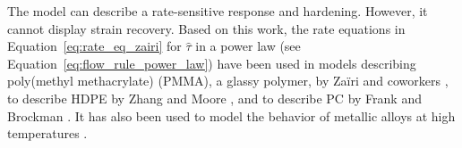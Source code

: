 The model can describe a rate-sensitive response and hardening.
However, it cannot display strain recovery.
Based on this work, the rate equations in Equation~\eqref{eq:rate_eq_zairi} for $\hat \tau$ in a power law (see Equation~\eqref{eq:flow_rule_power_law}) have been used in models describing poly(methyl methacrylate) (PMMA), a glassy polymer, by Zaïri and coworkers \citep{zairiPhenomenologicalNonlinearModelling2005, zairiElastoviscoplasticConstitutiveEquations2007,zairiModellingElastoviscoplasticDamage2008}, to describe HDPE by Zhang and Moore \citep{zhangNonlinearMechanicalResponse1997}, and to describe PC by Frank and Brockman \citep{frankViscoelasticViscoplasticConstitutive2001}.
It has also been used to model the behavior of metallic alloys at high temperatures \citep{desouzanetoComputationalMethodsPlasticity2008}.

